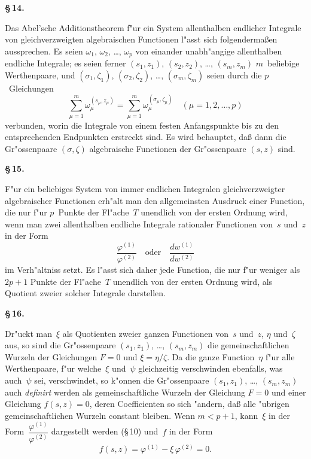 \documentclass[12pt,a4paper]{article}
\begin{document}
\medskip
\textbf{\S\,14.}

Das Abel'sche Additionstheorem f"ur ein System allenthalben endlicher
Integrale von gleichverzweigten algebraischen Functionen l"asst sich
folgenderma\ss{}en aussprechen. Es seien $\omega_1$, $\omega_2$, \ldots, $\omega_p$ von
einander unabh"angige allenthalben endliche Integrale; es seien ferner
$(s_1,z_1)$, $(s_2,z_2)$, \ldots, $(s_m,z_m)$ $m$~beliebige Werthenpaare, und
$(\sigma_1,\zeta_1)$, $(\sigma_2,\zeta_2)$, \ldots, $(\sigma_m,\zeta_m)$ seien durch die
$p$~Gleichungen
\begin{equation}
\label{eq:abel}
\sum_{\mu=1}^{m} \omega_\mu^{(s_\mu,z_\mu)} =
\sum_{\mu=1}^{m} \omega_\mu^{(\sigma_\mu,\zeta_\mu)}
\quad (\mu = 1, 2, \ldots, p)
\end{equation}
verbunden, worin die Integrale von einem festen Anfangspunkte bis zu den
entsprechenden Endpunkten erstreckt sind. Es wird behauptet, da\ss{} dann
die Gr"ossenpaare $(\sigma,\zeta)$ algebraische Functionen der Gr"ossenpaare
$(s,z)$ sind.

\medskip
\textbf{\S\,15.}

F"ur ein beliebiges System von immer endlichen Integralen
 gleichverzweigter algebraischer Functionen erh"alt man den allgemeinsten
Ausdruck einer Function, die nur f"ur $p$~Punkte der Fl"ache~$T$ unendlich
von der ersten Ordnung wird, wenn man zwei allenthalben endliche
Integrale rationaler Functionen von~$s$ und~$z$ in der Form
\[
\frac{\varphi^{(1)}}{\varphi^{(2)}} \quad \text{oder} \quad \frac{dw^{(1)}}{dw^{(2)}}
\]
im Verh"altniss setzt. Es l"asst sich daher jede Function, die nur f"ur
weniger als $2p + 1$ Punkte der Fl"ache~$T$ unendlich von der ersten
Ordnung wird, als Quotient zweier solcher Integrale darstellen.

\medskip
\textbf{\S\,16.}

Dr"uckt man~$\xi$ als Quotienten zweier ganzen Functionen von~$s$
und~$z$, $\eta$ und~$\zeta$ aus, so sind die Gr"ossenpaare $(s_1,z_1)$, \ldots,
$(s_m,z_m)$ die gemeinschaftlichen Wurzeln der Gleichungen $F = 0$ und
$\xi = \eta/\zeta$. Da die ganze Function~$\eta$ f"ur alle Werthenpaare, f"ur
welche~$\xi$ und~$\psi$ gleichzeitig verschwinden ebenfalls, was auch~$\psi$ sei,
verschwindet, so k"onnen die Gr"ossenpaare $(s_1,z_1)$, \ldots, $(s_m,z_m)$
auch \emph{definirt} werden als gemeinschaftliche Wurzeln der Gleichung $F = 0$
und einer Gleichung $f(s,z) = 0$, deren Coefficienten so sich "andern,
da\ss{} alle "ubrigen gemeinschaftlichen Wurzeln constant bleiben. Wenn
$m < p + 1$, kann~$\xi$ in der Form~$\dfrac{\varphi^{(1)}}{\varphi^{(2)}}$ dargestellt werden
(\S\,10) und~$f$ in der Form
\[
f(s,z) = \varphi^{(1)} - \xi\, \varphi^{(2)} = 0.
\]
\end{document}
